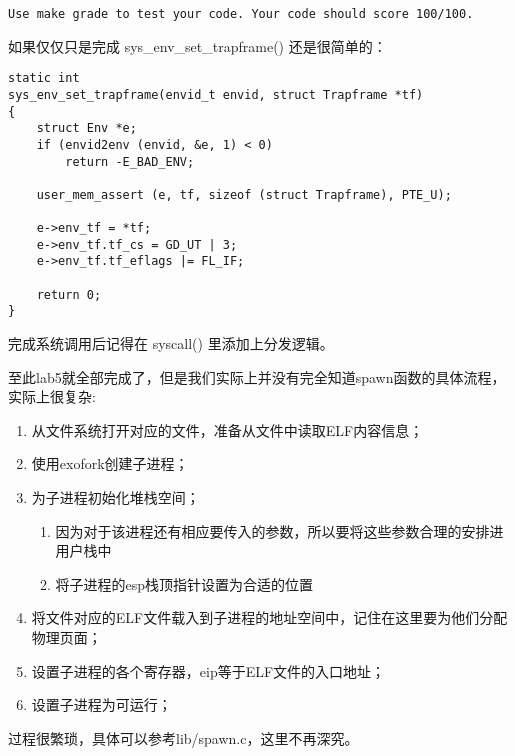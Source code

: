 \documentclass{article}
\newcommand{\funcname}[1]{{\ttfamily \small #1}}
\begin{document}
\begin{CJK*}{UTF8}{gkai}
\begin{lstlisting}[style=exercise]
Use make grade to test your code. Your code should score 100/100.
\end{lstlisting}

如果仅仅只是完成 \funcname{sys\_env\_set\_trapframe() }还是很简单的：

\begin{lstlisting}[style=ccode, title={\scriptsize \ttfamily \bfseries kern/: ()}]
static int
sys_env_set_trapframe(envid_t envid, struct Trapframe *tf)
{
    struct Env *e;
    if (envid2env (envid, &e, 1) < 0)
        return -E_BAD_ENV;

    user_mem_assert (e, tf, sizeof (struct Trapframe), PTE_U);

    e->env_tf = *tf;
    e->env_tf.tf_cs = GD_UT | 3;
    e->env_tf.tf_eflags |= FL_IF;
    
    return 0;
}
\end{lstlisting}

完成系统调用后记得在 \funcname{syscall()} 里添加上分发逻辑。

至此lab5就全部完成了，但是我们实际上并没有完全知道spawn函数的具体流程，实际上很复杂:

\begin{enumerate}
\item{从文件系统打开对应的文件，准备从文件中读取ELF内容信息；}
\item{使用exofork创建子进程；}
\item{为子进程初始化堆栈空间；
\begin{enumerate}
    \item{因为对于该进程还有相应要传入的参数，所以要将这些参数合理的安排进用户栈中}
    \item{将子进程的esp栈顶指针设置为合适的位置}
\end{enumerate}
}
\item{将文件对应的ELF文件载入到子进程的地址空间中，记住在这里要为他们分配物理页面；}
\item{设置子进程的各个寄存器，eip等于ELF文件的入口地址；}
\item{设置子进程为可运行；}
\end{enumerate}

过程很繁琐，具体可以参考lib/spawn.c，这里不再深究。


\clearpage

\end{CJK*}
\end{document}
